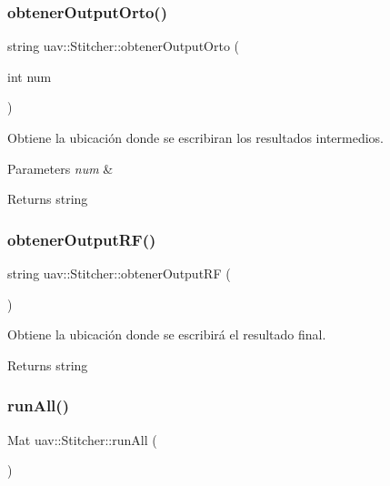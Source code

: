 \subsubsection{\texorpdfstring{obtener\+Output\+Orto()}{obtenerOutputOrto()}}
{\footnotesize\ttfamily string uav\+::\+Stitcher\+::obtener\+Output\+Orto (\begin{DoxyParamCaption}\item[{int}]{num }\end{DoxyParamCaption})\hspace{0.3cm}{\ttfamily [inline]}}



Obtiene la ubicación donde se escribiran los resultados intermedios. 


\begin{DoxyParams}{Parameters}
{\em num} & \\
\hline
\end{DoxyParams}
\begin{DoxyReturn}{Returns}
string 
\end{DoxyReturn}
\mbox{\label{classuav_1_1Stitcher_a5f6f8f09c80f39daf9f2ea34e0db91b9}} 
\subsubsection{\texorpdfstring{obtener\+Output\+R\+F()}{obtenerOutputRF()}}
{\footnotesize\ttfamily string uav\+::\+Stitcher\+::obtener\+Output\+RF (\begin{DoxyParamCaption}{ }\end{DoxyParamCaption})\hspace{0.3cm}{\ttfamily [inline]}}



Obtiene la ubicación donde se escribirá el resultado final. 

\begin{DoxyReturn}{Returns}
string 
\end{DoxyReturn}
\mbox{\label{classuav_1_1Stitcher_a0b78aba00328166db74d46884485f3bd}} 
\subsubsection{\texorpdfstring{run\+All()}{runAll()}}
{\footnotesize\ttfamily Mat uav\+::\+Stitcher\+::run\+All (\begin{DoxyParamCaption}{ }\end{DoxyParamCaption})\hspace{0.3cm}{\ttfamily [inline]}}



